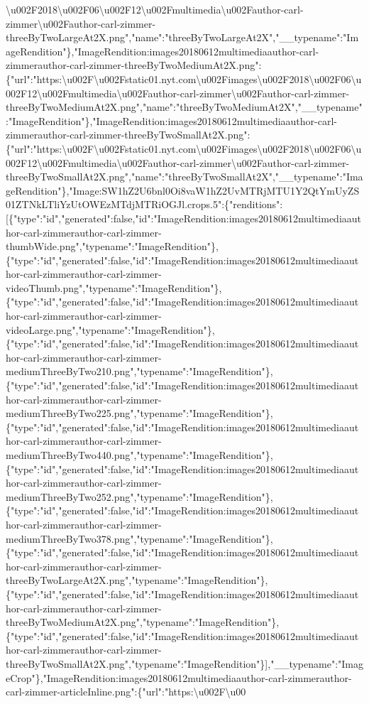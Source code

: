 \textbackslash{}u002F2018\textbackslash{}u002F06\textbackslash{}u002F12\textbackslash{}u002Fmultimedia\textbackslash{}u002Fauthor-carl-zimmer\textbackslash{}u002Fauthor-carl-zimmer-threeByTwoLargeAt2X.png","name":"threeByTwoLargeAt2X","\_\_typename":"ImageRendition"\},"ImageRendition:images20180612multimediaauthor-carl-zimmerauthor-carl-zimmer-threeByTwoMediumAt2X.png":\{"url":"https:\textbackslash{}u002F\textbackslash{}u002Fstatic01.nyt.com\textbackslash{}u002Fimages\textbackslash{}u002F2018\textbackslash{}u002F06\textbackslash{}u002F12\textbackslash{}u002Fmultimedia\textbackslash{}u002Fauthor-carl-zimmer\textbackslash{}u002Fauthor-carl-zimmer-threeByTwoMediumAt2X.png","name":"threeByTwoMediumAt2X","\_\_typename":"ImageRendition"\},"ImageRendition:images20180612multimediaauthor-carl-zimmerauthor-carl-zimmer-threeByTwoSmallAt2X.png":\{"url":"https:\textbackslash{}u002F\textbackslash{}u002Fstatic01.nyt.com\textbackslash{}u002Fimages\textbackslash{}u002F2018\textbackslash{}u002F06\textbackslash{}u002F12\textbackslash{}u002Fmultimedia\textbackslash{}u002Fauthor-carl-zimmer\textbackslash{}u002Fauthor-carl-zimmer-threeByTwoSmallAt2X.png","name":"threeByTwoSmallAt2X","\_\_typename":"ImageRendition"\},"Image:SW1hZ2U6bnl0Oi8vaW1hZ2UvMTRjMTU1Y2QtYmUyZS01ZTNkLTliYzUtOWEzMTdjMTRiOGJl.crops.5":\{"renditions":{[}\{"type":"id","generated":false,"id":"ImageRendition:images20180612multimediaauthor-carl-zimmerauthor-carl-zimmer-thumbWide.png","typename":"ImageRendition"\},\{"type":"id","generated":false,"id":"ImageRendition:images20180612multimediaauthor-carl-zimmerauthor-carl-zimmer-videoThumb.png","typename":"ImageRendition"\},\{"type":"id","generated":false,"id":"ImageRendition:images20180612multimediaauthor-carl-zimmerauthor-carl-zimmer-videoLarge.png","typename":"ImageRendition"\},\{"type":"id","generated":false,"id":"ImageRendition:images20180612multimediaauthor-carl-zimmerauthor-carl-zimmer-mediumThreeByTwo210.png","typename":"ImageRendition"\},\{"type":"id","generated":false,"id":"ImageRendition:images20180612multimediaauthor-carl-zimmerauthor-carl-zimmer-mediumThreeByTwo225.png","typename":"ImageRendition"\},\{"type":"id","generated":false,"id":"ImageRendition:images20180612multimediaauthor-carl-zimmerauthor-carl-zimmer-mediumThreeByTwo440.png","typename":"ImageRendition"\},\{"type":"id","generated":false,"id":"ImageRendition:images20180612multimediaauthor-carl-zimmerauthor-carl-zimmer-mediumThreeByTwo252.png","typename":"ImageRendition"\},\{"type":"id","generated":false,"id":"ImageRendition:images20180612multimediaauthor-carl-zimmerauthor-carl-zimmer-mediumThreeByTwo378.png","typename":"ImageRendition"\},\{"type":"id","generated":false,"id":"ImageRendition:images20180612multimediaauthor-carl-zimmerauthor-carl-zimmer-threeByTwoLargeAt2X.png","typename":"ImageRendition"\},\{"type":"id","generated":false,"id":"ImageRendition:images20180612multimediaauthor-carl-zimmerauthor-carl-zimmer-threeByTwoMediumAt2X.png","typename":"ImageRendition"\},\{"type":"id","generated":false,"id":"ImageRendition:images20180612multimediaauthor-carl-zimmerauthor-carl-zimmer-threeByTwoSmallAt2X.png","typename":"ImageRendition"\}{]},"\_\_typename":"ImageCrop"\},"ImageRendition:images20180612multimediaauthor-carl-zimmerauthor-carl-zimmer-articleInline.png":\{"url":"https:\textbackslash{}u002F\textbackslash{}u00